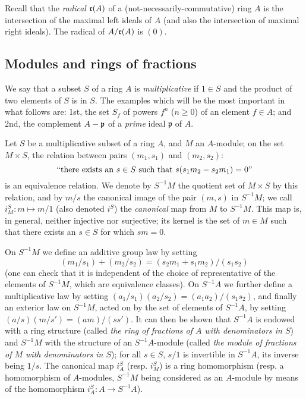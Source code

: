 \begin{env}[1.1.2]
\label{0.1.1.2}
Recall that the \emph{radical} $\mathfrak{r}(A)$ of a (not-necessarily-commutative) ring $A$ is the intersection of the maximal left ideals of $A$ (and also the intersection of maximal right ideals).
The radical of $A/\mathfrak{r}(A)$ is $(0)$.
\end{env}

\subsection{Modules and rings of fractions}
\label{subsection:0.1.2}

\begin{env}[1.2.1]
\label{0.1.2.1}
We say that a subset $S$ of a ring $A$ is \emph{multiplicative} if $1\in S$ and the product of two elements of $S$ is in $S$.
The examples which will be the most important in what follows are: 1st, the set $S_f$ of powers $f^n$ ($n\geq 0$) of an element $f\in A$; and 2nd, the complement $A-\mathfrak{p}$ of a \emph{prime} ideal $\mathfrak{p}$ of $A$.
\end{env}

\begin{env}[1.2.2]
\label{0.1.2.2}
Let $S$ be a multiplicative subset of a ring $A$, and $M$ an $A$-module; on the set
$M\times S$, the relation between pairs $(m_1,s_1)$ and $(m_2,s_2)$:
\[
  ``\text{there exists an }s\in S\text{ such that }s(s_1 m_2-s_2 m_1)=0\text{''}
\]
is an equivalence relation. We denote by $S^{-1}M$ the quotient set of
$M\times S$ by this relation, and by $m/s$ the canonical image of the pair $(m,s)$ in $S^{-1}M$; we call $i_M^S:m\mapsto m/1$ (also denoted $i^S$) the
\emph{canonical} map from $M$ to $S^{-1}M$. This map is, in general, neither
injective nor surjective; its kernel is the set of $m\in M$ such that there
exists an $s\in S$ for which $sm=0$.

On $S^{-1}M$ we define an additive group law by setting
\[
  (m_1/s_1)+(m_2/s_2)=(s_2 m_1+s_1 m_2)/(s_1 s_2)
\]
(one can check that it is independent of the choice of representative of the elements of $S^{-1}M$, which are equivalence classes).
On $S^{-1}A$ we further define a multiplicative law by setting
$(a_1/s_1)(a_2/s_2)=(a_1 a_2)/(s_1 s_2)$, and finally an exterior law on
$S^{-1}M$, acted on by the set of elements of $S^{-1}A$, by setting
$(a/s)(m/s')=(am)/(ss')$.
It can then be shown that $S^{-1}A$ is endowed with a
ring structure (called \emph{the ring of fractions of $A$ with denominators in
$S$}) and $S^{-1}M$ with the structure of an $S^{-1}A$-module (called \emph{the
module of fractions of $M$ with denominators in $S$}); for all $s\in S$, $s/1$
is invertible in $S^{-1}A$, its inverse being $1/s$.
The canonical map $i_A^S$ (resp. $i_M^S$) is a ring homomorphism (resp. a homomorphism of $A$-modules,
$S^{-1}M$ being considered as an $A$-module by means of the homomorphism
$i_A^S:A\to S^{-1}A$).
\end{env}

